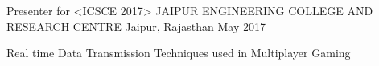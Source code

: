\begin{cventries}
  \cventry
    {Presenter for <ICSCE 2017>}
    {JAIPUR ENGINEERING COLLEGE AND RESEARCH CENTRE }
    {Jaipur, Rajasthan}
    {May 2017}
    {
      \begin{cvitems}
        \item {Real time Data Transmission Techniques used in Multiplayer Gaming}
      \end{cvitems}
    }
\end{cventries}